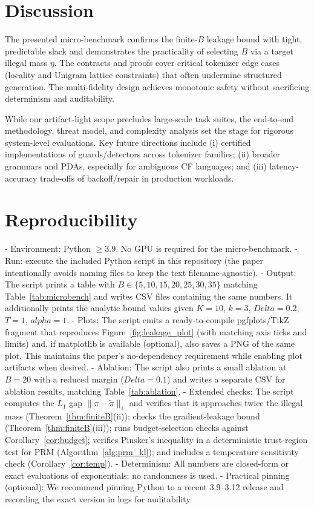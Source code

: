 \documentclass{article}
\def\alpha{alpha}%
\def\Delta{Delta}%
\begin{document}
\section{Discussion}
The presented micro-benchmark confirms the finite-$B$ leakage bound with tight, predictable slack and demonstrates the practicality of selecting $B$ via a target illegal mass $\eta$. The contracts and proofs cover critical tokenizer edge cases (locality and Unigram lattice constraints) that often undermine structured generation. The multi-fidelity design achieves monotonic safety without sacrificing determinism and auditability.

While our artifact-light scope precludes large-scale task suites, the end-to-end methodology, threat model, and complexity analysis set the stage for rigorous system-level evaluations. Key future directions include (i) certified implementations of guards/detectors across tokenizer families; (ii) broader grammars and PDAs, especially for ambiguous CF languages; and (iii) latency-accuracy trade-offs of backoff/repair in production workloads.

\section{Reproducibility}\label{sec:repro}
- Environment: Python $\ge$3.9. No GPU is required for the micro-benchmark.
- Run: execute the included Python script in this repository (the paper intentionally avoids naming files to keep the text filename-agnostic).
- Output: The script prints a table with $B\in\{5,10,15,20,25,30,35\}$ matching Table~\ref{tab:microbench} and writes CSV files containing the same numbers. It additionally prints the analytic bound values given $K=10$, $k=3$, $\Delta=0.2$, $T=1$, $\alpha=1$.
- Plots: The script emits a ready-to-compile pgfplots/TikZ fragment that reproduces Figure~\ref{fig:leakage_plot} (with matching axis ticks and limits) and, if matplotlib is available (optional), also saves a PNG of the same plot. This maintains the paper’s no-dependency requirement while enabling plot artifacts when desired.
- Ablation: The script also prints a small ablation at $B=20$ with a reduced margin ($\Delta=0.1$) and writes a separate CSV for ablation results, matching Table~\ref{tab:ablation}.
- Extended checks: The script computes the $L_1$ gap $\|\pi-\tilde{\pi}\|_1$ and verifies that it approaches twice the illegal mass (Theorem~\ref{thm:finiteB}(ii)); checks the gradient-leakage bound (Theorem~\ref{thm:finiteB}(iii)); runs budget-selection checks against Corollary~\ref{cor:budget}; verifies Pinsker’s inequality in a deterministic trust-region test for PRM (Algorithm~\ref{alg:prm_kl}); and includes a temperature sensitivity check (Corollary~\ref{cor:temp}).
- Determinism: All numbers are closed-form or exact evaluations of exponentials; no randomness is used.
- Practical pinning (optional): We recommend pinning Python to a recent 3.9–3.12 release and recording the exact version in logs for auditability.
\end{document}
